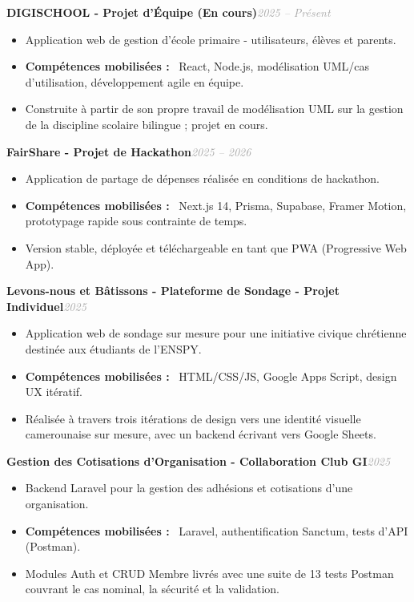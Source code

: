 \documentclass[10pt, a4paper]{article}
\newcommand{\entryhead}[2]{%
  \noindent\textbf{#1}\hfill{\small\textit{\textcolor{darkgray}{#2}}}\\[-4pt]%
}
\newcommand{\blabel}[1]{\textbf{#1}\ }
\begin{document}
\vspace{4pt}
\entryhead{DIGISCHOOL \normalfont\small- Projet d'Équipe (En cours)}{2025 -- Présent}
\begin{itemize}
  \item Application web de gestion d'école primaire - utilisateurs, élèves et parents.
  \item \blabel{Compétences mobilisées :} React, Node.js, modélisation UML/cas d'utilisation,
        développement agile en équipe.
  \item Construite à partir de son propre travail de modélisation UML sur la gestion de la
        discipline scolaire bilingue ; projet en cours.
\end{itemize}

\vspace{4pt}
\entryhead{FairShare \normalfont\small- Projet de Hackathon}{2025 -- 2026}
\begin{itemize}
  \item Application de partage de dépenses réalisée en conditions de hackathon.
  \item \blabel{Compétences mobilisées :} Next.js 14, Prisma, Supabase, Framer Motion,
        prototypage rapide sous contrainte de temps.
  \item Version stable, déployée et téléchargeable en tant que PWA (Progressive Web App).
\end{itemize}

\vspace{4pt}
\entryhead{Levons-nous et Bâtissons - Plateforme de Sondage \normalfont\small- Projet Individuel}{2025}
\begin{itemize}
  \item Application web de sondage sur mesure pour une initiative civique chrétienne destinée
        aux étudiants de l'ENSPY.
  \item \blabel{Compétences mobilisées :} HTML/CSS/JS, Google Apps Script, design UX itératif.
  \item Réalisée à travers trois itérations de design vers une identité visuelle camerounaise
        sur mesure, avec un backend écrivant vers Google Sheets.
\end{itemize}

\vspace{4pt}
\entryhead{Gestion des Cotisations d'Organisation \normalfont\small- Collaboration Club GI}{2025}
\begin{itemize}
  \item Backend Laravel pour la gestion des adhésions et cotisations d'une organisation.
  \item \blabel{Compétences mobilisées :} Laravel, authentification Sanctum, tests d'API
        (Postman).
  \item Modules Auth et CRUD Membre livrés avec une suite de 13 tests Postman couvrant le cas
        nominal, la sécurité et la validation.
\end{itemize}
\end{document}
